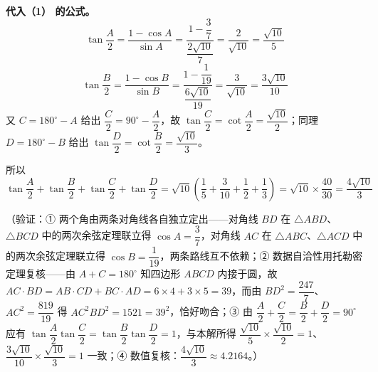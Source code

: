 \begin{answer}
\textbf{代入（1） 的公式。}
\nopagebreak[4]
\[\tan\dfrac A2=\dfrac{1-\cos A}{\sin A}=\dfrac{1-\dfrac37}{\dfrac{2\sqrt{10}}7}=\dfrac{2}{\sqrt{10}}=\dfrac{\sqrt{10}}5\]
\nopagebreak[4]
\[\tan\dfrac B2=\dfrac{1-\cos B}{\sin B}=\dfrac{1-\dfrac1{19}}{\dfrac{6\sqrt{10}}{19}}=\dfrac{3}{\sqrt{10}}=\dfrac{3\sqrt{10}}{10}\]
又 \(C=180^{\circ}-A\) 给出 \(\dfrac C2=90^{\circ}-\dfrac A2\)，故 \(\tan\dfrac C2=\cot\dfrac A2=\dfrac{\sqrt{10}}2\)；同理 \(D=180^{\circ}-B\) 给出 \(\tan\dfrac D2=\cot\dfrac B2=\dfrac{\sqrt{10}}3\)。

所以
\nopagebreak[4]
\[\tan\dfrac A2+\tan\dfrac B2+\tan\dfrac C2+\tan\dfrac D2=\sqrt{10}\left(\dfrac15+\dfrac3{10}+\dfrac12+\dfrac13\right)=\sqrt{10}\times\dfrac{40}{30}=\dfrac{4\sqrt{10}}3\]

（验证：① 两个角由两条对角线各自独立定出——对角线 \(BD\) 在 \(\triangle ABD\)、\(\triangle BCD\) 中的两次余弦定理联立得 \(\cos A=\dfrac37\)，对角线 \(AC\) 在 \(\triangle ABC\)、\(\triangle ACD\) 中的两次余弦定理联立得 \(\cos B=\dfrac1{19}\)，两条路线互不依赖；② 数据自洽性用托勒密定理复核——由 \(A+C=180^{\circ}\) 知四边形 \(ABCD\) 内接于圆，故 \(AC\cdot BD=AB\cdot CD+BC\cdot AD=6\times4+3\times5=39\)，而由 \(BD^{2}=\dfrac{247}7\)、\(AC^{2}=\dfrac{819}{19}\) 得 \(AC^{2}BD^{2}=1521=39^{2}\)，恰好吻合；③ 由 \(\dfrac A2+\dfrac C2=\dfrac B2+\dfrac D2=90^{\circ}\) 应有 \(\tan\dfrac A2\tan\dfrac C2=\tan\dfrac B2\tan\dfrac D2=1\)，与本解所得 \(\dfrac{\sqrt{10}}5\times\dfrac{\sqrt{10}}2=1\)、\(\dfrac{3\sqrt{10}}{10}\times\dfrac{\sqrt{10}}3=1\) 一致；④ 数值复核：\(\dfrac{4\sqrt{10}}3\approx4.2164\)。）



\end{answer}
